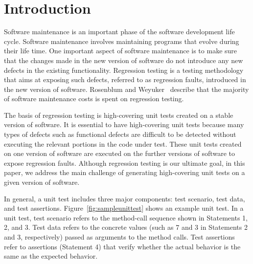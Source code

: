 \section{Introduction}
\label{sec:intro}

Software maintenance is an important phase of the software development life cycle. Software maintenance involves maintaining programs that evolve during their life time. One important aspect of software maintenance is to make sure that the changes made in the new version of software do not introduce any new defects in the existing functionality. Regression testing is a testing methodology that aims at exposing such defects, referred to as regression faults, introduced in the new version of software. Rosenblum and Weyuker~\cite{rosenblum96:regression} describe that the majority of software maintenance costs is spent on regression testing.

The basis of regression testing is high-covering unit tests created on a stable version of software. It is essential to have high-covering unit tests because many types of defects such as functional defects are difficult to be detected without executing the relevant portions in the code under test. These unit tests created on one version of software are executed on the further versions of software to expose regression faults. Although regression testing is our ultimate goal, in this paper, we address
the main challenge of generating high-covering unit tests on a given version of software.

In general, a unit test includes three major components: test scenario, test data, and test assertions. Figure~\ref{fig:sampleunittest} shows an example unit test. In a unit test, test scenario refers to the method-call sequence shown in Statements 1, 2, and 3. Test data refers to the concrete values (such as 7 and 3 in Statements 2 and 3, respectively) passed as arguments to the method calls. Test assertions refer to assertions (Statement 4) that verify whether the actual behavior is the same as the expected behavior.

